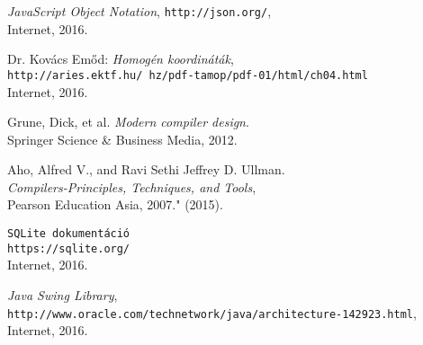 \begin{thebibliography}{9}
\emph{JavaScript Object Notation}, \texttt{http://json.org/}, \\
Internet, 2016.

Dr. Kovács Emőd: \emph{Homogén koordináták}, \\
\texttt{http://aries.ektf.hu/~hz/pdf-tamop/pdf-01/html/ch04.html} \\
Internet, 2016.

Grune, Dick, et al. \emph{Modern compiler design}. \\
Springer Science \& Business Media, 2012.

Aho, Alfred V., and Ravi Sethi Jeffrey D. Ullman. \\
\emph{Compilers-Principles, Techniques, and Tools}, \\
Pearson Education Asia, 2007." (2015).

\texttt{SQLite dokumentáció} \\
\texttt{https://sqlite.org/} \\
Internet, 2016.

\emph{Java Swing Library}, \\
\texttt{http://www.oracle.com/technetwork/java/architecture-142923.html}, \\
Internet, 2016.

\end{thebibliography}
